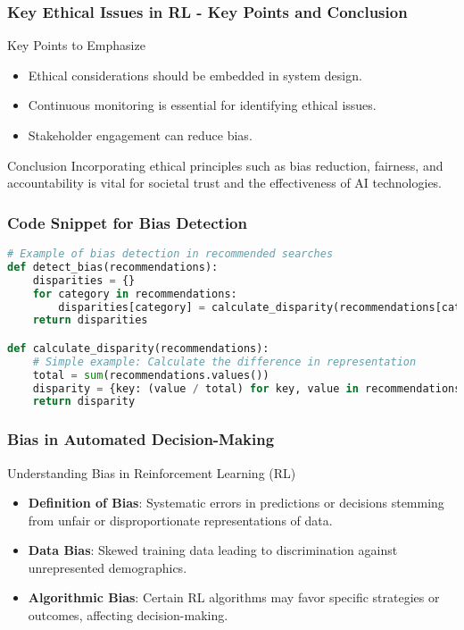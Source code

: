 \documentclass{beamer}
\begin{document}
\begin{frame}[fragile]
    \frametitle{Key Ethical Issues in RL - Key Points and Conclusion}
    \begin{block}{Key Points to Emphasize}
        \begin{itemize}
            \item Ethical considerations should be embedded in system design.
            \item Continuous monitoring is essential for identifying ethical issues.
            \item Stakeholder engagement can reduce bias.
        \end{itemize}
    \end{block}
    
    \begin{block}{Conclusion}
        Incorporating ethical principles such as bias reduction, fairness, and accountability is vital for societal trust and the effectiveness of AI technologies.
    \end{block}
\end{frame}

\begin{frame}[fragile]
    \frametitle{Code Snippet for Bias Detection}
    \begin{lstlisting}[language=Python]
# Example of bias detection in recommended searches
def detect_bias(recommendations):
    disparities = {}
    for category in recommendations:
        disparities[category] = calculate_disparity(recommendations[category])
    return disparities

def calculate_disparity(recommendations):
    # Simple example: Calculate the difference in representation
    total = sum(recommendations.values())
    disparity = {key: (value / total) for key, value in recommendations.items()}
    return disparity
    \end{lstlisting}
\end{frame}

\begin{frame}[fragile]
    \frametitle{Bias in Automated Decision-Making}
    \begin{block}{Understanding Bias in Reinforcement Learning (RL)}
        \begin{itemize}
            \item \textbf{Definition of Bias}: Systematic errors in predictions or decisions stemming from unfair or disproportionate representations of data.
            \item \textbf{Data Bias}: Skewed training data leading to discrimination against unrepresented demographics.
            \item \textbf{Algorithmic Bias}: Certain RL algorithms may favor specific strategies or outcomes, affecting decision-making.
        \end{itemize}
    \end{block}
\end{frame}
\end{document}
